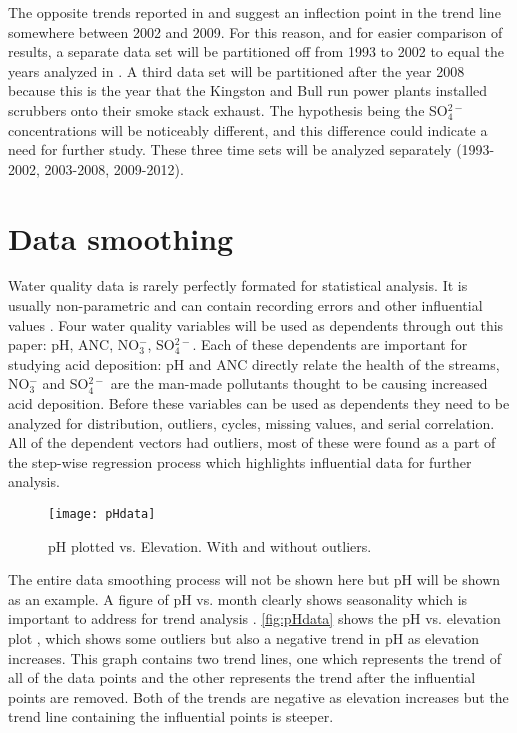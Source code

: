 The opposite trends reported in  \citet{robinson2008ph} and \citet{cai2013} suggest an inflection point in the trend line somewhere between 2002 and 2009. 
For this reason, and for easier comparison of results,  a separate data set will be partitioned off from 1993 to 2002 to equal the years analyzed in \citet{robinson2008ph}.  
A third data set will be partitioned after the year 2008 because this is the year that the Kingston and Bull run power plants installed scrubbers onto their smoke stack exhaust. 
The hypothesis being the SO$_4^{2-}$ concentrations will be noticeably different, and this difference could indicate a need for further study. 
These three time sets will be analyzed separately (1993-2002, 2003-2008, 2009-2012).

\section{Data smoothing}%

Water quality data is rarely perfectly formated for statistical analysis.
It is usually  non-parametric and can contain recording errors and other influential values \citep{helsel1992statistical}.
Four water quality variables will be used as dependents through out this paper: pH, ANC, NO$_3^-$, SO$_4^{2-}$.
Each of these dependents are important for studying acid deposition: pH and ANC directly relate the health of the streams, NO$_3^-$ and SO$_4^{2-}$ are the man-made pollutants thought to be causing increased acid deposition.
Before these variables can be used as dependents they need to be analyzed for distribution, outliers, cycles, missing values, and serial correlation\citep{helsel1992statistical}.
All of the dependent vectors had outliers, most of these were found as a part of the step-wise regression process which highlights influential data for further analysis.

\begin{figure}[h!]
\centering
	\texttt{[image: pHdata]}\\
	\caption{pH plotted vs. Elevation. With and without outliers.}
	\label{fig:pHdata}
\end{figure}

The entire data smoothing process will not be shown here but pH will be shown as an example.
A figure of pH vs. month clearly shows seasonality which is important to address for trend analysis \citep{helsel1992statistical}.
\autoref{fig:pHdata} shows the pH vs. elevation plot , which shows some outliers but also a negative trend in pH as elevation increases.
This graph contains two trend lines, one which represents the trend of all of the data points and the other represents the trend after the influential points are removed. 
Both of the trends are negative as elevation increases but the trend line containing the influential points is steeper. 

